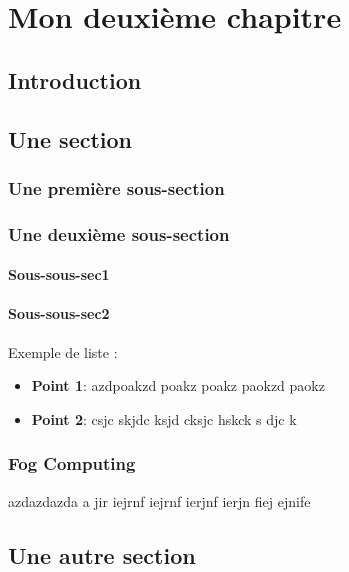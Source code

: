 \chapter{Mon deuxième chapitre}
\section{Introduction}
\lipsum[1-1]%
\section{Une section}

\subsection{Une première sous-section}
\lipsum[1-1]%

\subsection{Une deuxième sous-section}
\lipsum[1-1]%

\subsubsection{Sous-sous-sec1}
\lipsum[1-1]%
\subsubsection{Sous-sous-sec2}

Exemple de liste :
\begin{itemize}
	\item \textbf{Point 1}: azdpoakzd poakz poakz paokzd paokz 
	\item \textbf{Point 2}: csjc skjdc ksjd cksjc hskck s djc k
\end{itemize}
\subsection{Fog Computing}
azdazdazda a  jir iejrnf iejrnf ierjnf ierjn fiej ejnife
\section{Une autre section}
\lipsum[1-1] %